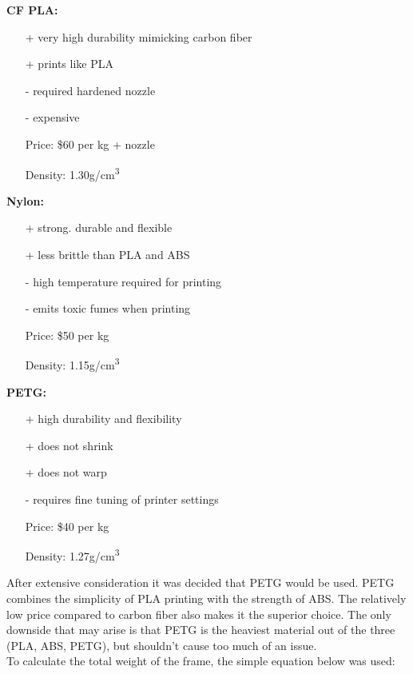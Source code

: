 \documentclass[12pt]{article}
\begin{document}
\textbf{CF PLA:}
\renewcommand{\labelitemi}{\textperiodcentered}
\begin{itemize}
\item[+] very high durability mimicking carbon fiber
\item[+] prints like PLA
\item[-] required hardened nozzle
\item[-] expensive
\item[Price:] \$60 per kg + nozzle
\item[Density:] 1.30g/cm\textsuperscript{3}
\end{itemize}
\vspace{5mm}

\textbf{Nylon:}
\renewcommand{\labelitemi}{\textperiodcentered}
\begin{itemize}
\item[+] strong. durable and flexible
\item[+] less brittle than PLA and ABS
\item[-] high temperature required for printing
\item[-] emits toxic fumes when printing
\item[Price:] \$50 per kg
\item[Density:] 1.15g/cm\textsuperscript{3}
\end{itemize}
\vspace{5mm}

\textbf{PETG:}
\renewcommand{\labelitemi}{\textperiodcentered}
\begin{itemize}
\item[+] high durability and flexibility
\item[+] does not shrink
\item[+] does not warp
\item[-] requires fine tuning of printer settings
\item[Price:] \$40 per kg
\item[Density:] 1.27g/cm\textsuperscript{3}
\end{itemize}

After extensive consideration it was decided that PETG would be used. PETG combines the simplicity of PLA printing with the strength of ABS. The relatively low price compared to carbon fiber also makes it the superior choice. The only downside that may arise is that PETG is the heaviest material out of the three (PLA, ABS, PETG), but shouldn't cause too much of an issue. 
\\

To calculate the total weight of the frame, the simple equation below was used:
\end{document}
